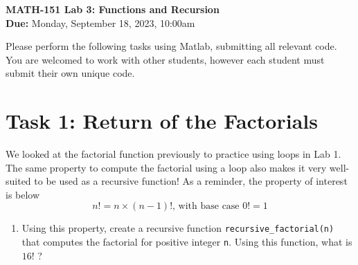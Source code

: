 \documentclass[11pt]{article}
\begin{document}
	
	\begin{center}
		\Large{\textbf{MATH-151 Lab 3: Functions and Recursion}}\\
			\medskip
		\normalsize{\textbf{Due:} Monday, September 18, 2023, 10:00am} 
	\end{center}
	\noindent\makebox[\linewidth]{\rule{\textwidth}{0.4pt}}
	Please perform the following tasks using Matlab, submitting all relevant code. You are welcomed to work with other students, however each student must submit their own unique code.
	\section*{Task 1: Return of the Factorials}
	\noindent We looked at the factorial function previously to practice using loops in Lab 1. The same property to compute the factorial using a loop also makes it very well-suited to be used as a recursive function! As a reminder, the property of interest is below\\
	\begin{equation*}
		n! = n\times(n-1)!\text{, with base case } 0! = 1
	\end{equation*}
	\begin{enumerate}[label=\alph*)]
		\item Using this property, create a recursive function \texttt{recursive\_factorial(n)} that computes the factorial for positive integer \texttt{n}. Using this function, what is $16!$ ?
	\end{enumerate}
\end{document}
